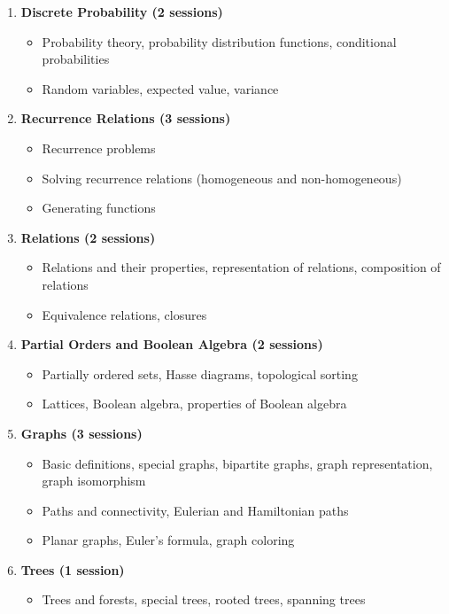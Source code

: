 \documentclass[12pt]{article}
\begin{document}
\begin{enumerate}
    \item \textbf{Discrete Probability (2 sessions)}
    \begin{itemize}
        \item Probability theory, probability distribution functions, conditional probabilities
        \item Random variables, expected value, variance
    \end{itemize}
    \item \textbf{Recurrence Relations (3 sessions)}
    \begin{itemize}
        \item Recurrence problems
        \item Solving recurrence relations (homogeneous and non-homogeneous)
        \item Generating functions
    \end{itemize}
    \item \textbf{Relations (2 sessions)}
    \begin{itemize}
        \item Relations and their properties, representation of relations, composition of relations
        \item Equivalence relations, closures
    \end{itemize}
    \item \textbf{Partial Orders and Boolean Algebra (2 sessions)}
    \begin{itemize}
        \item Partially ordered sets, Hasse diagrams, topological sorting
        \item Lattices, Boolean algebra, properties of Boolean algebra
    \end{itemize}
    \item \textbf{Graphs (3 sessions)}
    \begin{itemize}
        \item Basic definitions, special graphs, bipartite graphs, graph representation, graph isomorphism
        \item Paths and connectivity, Eulerian and Hamiltonian paths
        \item Planar graphs, Euler's formula, graph coloring
    \end{itemize}
    \item \textbf{Trees (1 session)}
    \begin{itemize}
        \item Trees and forests, special trees, rooted trees, spanning trees

\end{itemize}
\end{enumerate}
\end{document}
